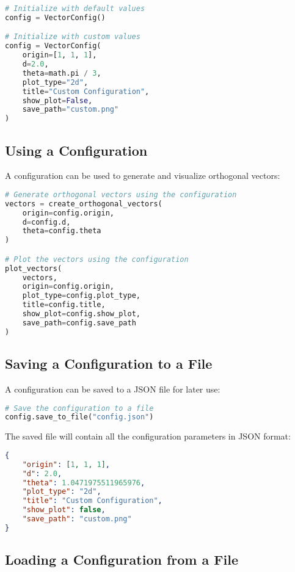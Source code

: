 \begin{lstlisting}[language=Python]
# Initialize with default values
config = VectorConfig()

# Initialize with custom values
config = VectorConfig(
    origin=[1, 1, 1],
    d=2.0,
    theta=math.pi / 3,
    plot_type="2d",
    title="Custom Configuration",
    show_plot=False,
    save_path="custom.png"
)
\end{lstlisting}

\subsection{Using a Configuration}

A configuration can be used to generate and visualize orthogonal vectors:

\begin{lstlisting}[language=Python]
# Generate orthogonal vectors using the configuration
vectors = create_orthogonal_vectors(
    origin=config.origin,
    d=config.d,
    theta=config.theta
)

# Plot the vectors using the configuration
plot_vectors(
    vectors,
    origin=config.origin,
    plot_type=config.plot_type,
    title=config.title,
    show_plot=config.show_plot,
    save_path=config.save_path
)
\end{lstlisting}

\subsection{Saving a Configuration to a File}

A configuration can be saved to a JSON file for later use:

\begin{lstlisting}[language=Python]
# Save the configuration to a file
config.save_to_file("config.json")
\end{lstlisting}

The saved file will contain all the configuration parameters in JSON format:

\begin{lstlisting}[language=JSON]
{
    "origin": [1, 1, 1],
    "d": 2.0,
    "theta": 1.0471975511965976,
    "plot_type": "2d",
    "title": "Custom Configuration",
    "show_plot": false,
    "save_path": "custom.png"
}
\end{lstlisting}

\subsection{Loading a Configuration from a File}


